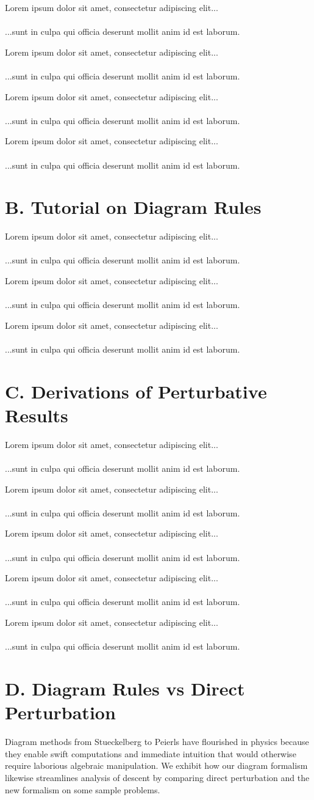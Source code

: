 \documentclass{article}
\newcommand{\lorem}[1]{
    Lorem ipsum dolor sit amet, consectetur adipiscing elit...\\
    \nopagebreak\vspace{#1cm} \ \\
    ...sunt in culpa qui officia deserunt mollit anim id est laborum.
}
\begin{document}
    \lorem{3}
    \lorem{3}
    \lorem{3}
    \lorem{3}

\section*{B. Tutorial on Diagram Rules}
    \lorem{3}
    \lorem{3}
    \lorem{3}

\section*{C. Derivations of Perturbative Results}

    \lorem{3}
    \lorem{3}
    \lorem{3}
    \lorem{3}
    \lorem{3}

\section*{D. Diagram Rules vs Direct Perturbation}
    Diagram methods from Stueckelberg to Peierls have flourished in physics
    because they enable swift computations and immediate intuition that would
    otherwise require laborious algebraic manipulation.  We exhibit how our
    diagram formalism likewise streamlines analysis of descent by comparing
    direct perturbation and the new formalism on some sample problems.
\end{document}
